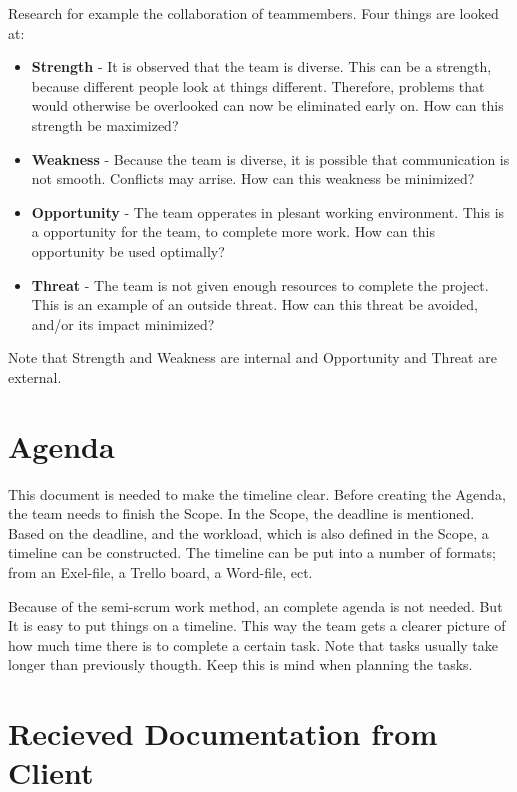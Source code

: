 \documentclass[10pt]{report}
\begin{document}
Research for example the collaboration of teammembers. Four things are looked at:

\begin{itemize}
	\item \textbf{Strength} - It is observed that the team is diverse. This can be a strength, because different people look at things different. Therefore, problems that would otherwise be overlooked can now be eliminated early on. How can this strength be maximized?
	\item \textbf{Weakness} - Because the team is diverse, it is possible that communication is not smooth. Conflicts may arrise. How can this weakness be minimized?
	\item \textbf{Opportunity} - The team opperates in plesant working environment. This is a opportunity for the team, to complete more work. How can this opportunity be used optimally?
	\item \textbf{Threat} - The team is not given enough resources to complete the project. This is an example of an outside threat. How can this threat be avoided, and/or its impact minimized?
\end{itemize}

Note that Strength and Weakness are internal and Opportunity and Threat are external.

\newpage

\section{Agenda}

This document is needed to make the timeline clear. Before creating the Agenda, the team needs to finish the Scope. In the Scope, the deadline is mentioned. Based on the deadline, and the workload, which is also defined in the Scope, a timeline can be constructed. The timeline can be put into a number of formats; from an Exel-file, a Trello board, a Word-file, ect.

Because of the semi-scrum work method, an complete agenda is not needed. But It is easy to put things on a timeline. This way the team gets a clearer picture of how much time there is to complete a certain task. Note that tasks usually take longer than previously thougth. Keep this is mind when planning the tasks.

\newpage

\section{Recieved Documentation from Client}
\end{document}
